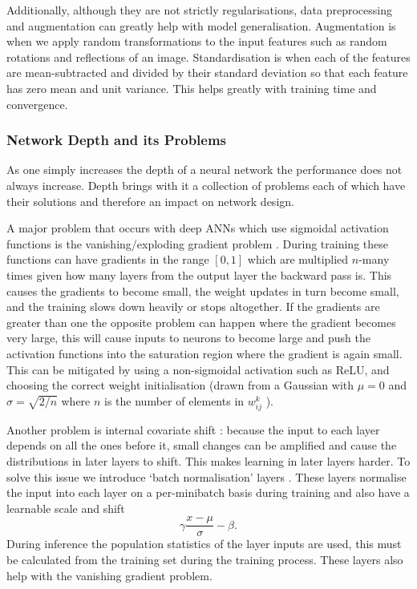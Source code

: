 Additionally, although they are not strictly regularisations, data preprocessing and augmentation can greatly help with model generalisation. Augmentation is when we apply random transformations to the input features such as random rotations and reflections of an image. Standardisation is when each of the features are mean-subtracted and divided by their standard deviation so that each feature has zero mean and unit variance. This helps greatly with training time and convergence. 


\subsubsection{Network Depth and its Problems}
As one simply increases the depth of a neural network the performance does not always increase. Depth brings with it a collection of problems each of which have their solutions and therefore an impact on network design. 

A major problem that occurs with deep ANNs which use sigmoidal activation functions is the vanishing/exploding gradient problem \cite{VanishingGradient}. During training these functions can have gradients in the range $[0,1]$ which are multiplied $n$-many times given how many layers from the output layer the backward pass is. This causes the gradients to become small, the weight updates in turn become small, and the training slows down heavily or stops altogether. If the gradients are greater than one the opposite problem can happen where the gradient becomes very large, this will cause inputs to neurons to become large and push the activation functions into the saturation region where the gradient is again small. 
This can be mitigated by using a non-sigmoidal activation such as ReLU, and choosing the correct weight initialisation (drawn from a Gaussian with $\mu=0$ and $\sigma=\sqrt{2/n}$ where $n$ is the number of elements in $w_{ij}^{k}$ \cite{HeEtAl}). 

Another problem is internal covariate shift \cite{BatchNorm}: because the input to each layer depends on all the ones before it, small changes can be amplified and cause the distributions in later layers to shift. This makes learning in later layers harder. 
To solve this issue we introduce `batch normalisation' layers \cite{BatchNorm}. These layers normalise the input into each layer on a per-minibatch basis during training and also have a learnable scale and shift
\begin{equation}
    \gamma\frac{x-\mu}{\sigma} - \beta.
\end{equation}
During inference the population statistics of the layer inputs are used, this must be calculated from the training set during the training process. These layers also help with the vanishing gradient problem. 

